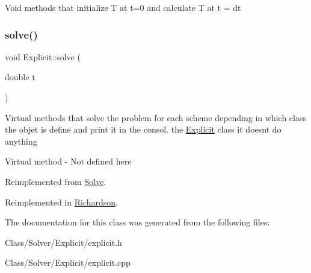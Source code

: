 Void methods that initialize T at t=0 and calculate T at t = dt \mbox{\label{class_explicit_ac99aa17bfd95f66b33e5c0ecf0e53785}} 
\subsubsection{\texorpdfstring{solve()}{solve()}}
{\footnotesize\ttfamily void Explicit\+::solve (\begin{DoxyParamCaption}\item[{double}]{t }\end{DoxyParamCaption})\hspace{0.3cm}{\ttfamily [virtual]}}

Virtual methods that solve the problem for each scheme depending in which class the objet is define and print it in the consol.  the \hyperlink{class_explicit}{Explicit} class it doesn\textquotesingle{}t do anything

Virtual method -\/ Not defined here 

Reimplemented from \hyperlink{class_solve_a1a56722993fdabea9928637d7dd8a2c7}{Solve}.



Reimplemented in \hyperlink{class_richardson_ab8dd2ff0e58c11092fead4d45a4f5c64}{Richardson}.



The documentation for this class was generated from the following files\+:\begin{DoxyCompactItemize}
\item 
Class/\+Solver/\+Explicit/explicit.\+h\item 
Class/\+Solver/\+Explicit/explicit.\+cpp\end{DoxyCompactItemize}
